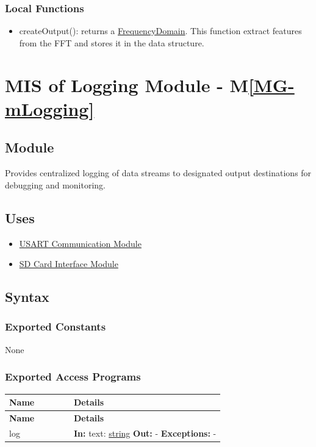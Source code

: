 \documentclass[12pt, titlepage]{article}
\newcommand{\mref}[1]{M\ref{#1}}
\newenvironment{apitable}{%
\begin{center}
\begin{longtable}{|p{0.3\linewidth}|p{0.7\linewidth}|} 
\hline
\textbf{Name} & \textbf{Details} \\
\hline
\endfirsthead
\hline
\textbf{Name} & \textbf{Details} \\
\hline
\endhead
\hline
\endfoot
\hline
\endlastfoot
}{%
\end{longtable}
\end{center}
}
\newcommand{\apifunc}[4]{%
#1 & 
\textbf{In:} #2 \newline
\textbf{Out:} #3 \newline
\textbf{Exceptions:} #4 \\
\hline
}
\begin{document}
\subsubsection{Local Functions}

\begin{itemize}
  \item createOutput(): returns a
    \hyperref[struct:FrequencyDomain]{FrequencyDomain}. This function extract
    features from the FFT and stores it in the data structure.
\end{itemize}

\newpage

\section{MIS of Logging Module \label{mod:Logging} - \mref{MG-mLogging}}

\subsection{Module}

Provides centralized logging of data streams to designated output destinations
for debugging and monitoring.

\subsection{Uses}

\begin{itemize}
  \item \hyperref[mod:UsartComm]{USART Communication Module}
  \item \hyperref[mod:sdcard]{SD Card Interface Module}
\end{itemize}

\subsection{Syntax}
\subsubsection{Exported Constants}

None

\subsubsection{Exported Access Programs}
\begin{apitable}
  \apifunc{log}{text: \hyperref[generic:string]{string}}{-}{-}
\end{apitable}
\end{document}
